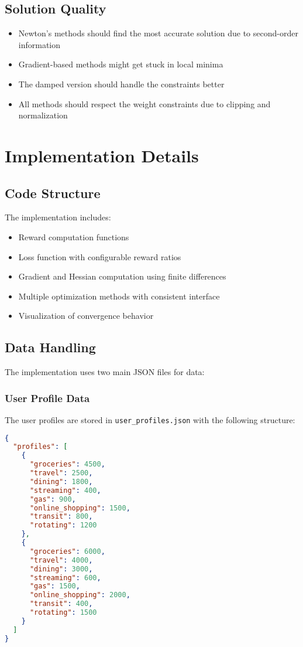 \documentclass{article}
\begin{document}
\subsection{Solution Quality}
\begin{itemize}
    \item Newton's methods should find the most accurate solution due to second-order information
    \item Gradient-based methods might get stuck in local minima
    \item The damped version should handle the constraints better
    \item All methods should respect the weight constraints due to clipping and normalization
\end{itemize}

\section{Implementation Details}
\subsection{Code Structure}
The implementation includes:
\begin{itemize}
    \item Reward computation functions
    \item Loss function with configurable reward ratios
    \item Gradient and Hessian computation using finite differences
    \item Multiple optimization methods with consistent interface
    \item Visualization of convergence behavior
\end{itemize}

\subsection{Data Handling}
The implementation uses two main JSON files for data:

\subsubsection{User Profile Data}
The user profiles are stored in \texttt{user\_profiles.json} with the following structure:
\begin{lstlisting}[language=json]
{
  "profiles": [
    {
      "groceries": 4500,
      "travel": 2500,
      "dining": 1800,
      "streaming": 400,
      "gas": 900,
      "online_shopping": 1500,
      "transit": 800,
      "rotating": 1200
    },
    {
      "groceries": 6000,
      "travel": 4000,
      "dining": 3000,
      "streaming": 600,
      "gas": 1500,
      "online_shopping": 2000,
      "transit": 400,
      "rotating": 1500
    }
  ]
}
\end{lstlisting}
\end{document}
